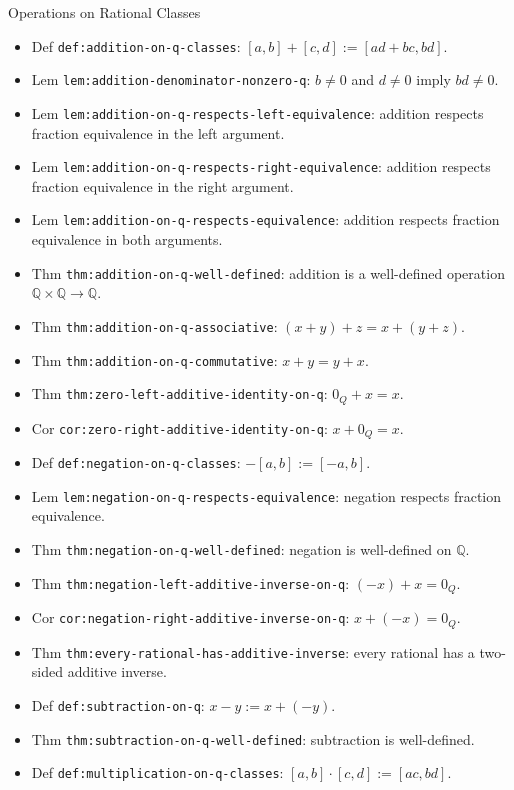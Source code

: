 \begin{topicbox}{Operations on Rational Classes}
\begin{itemize}
  \item Def \texttt{def:addition-on-q-classes}: $[a,b]+[c,d]:=[ad+bc,bd]$.
  \item Lem \texttt{lem:addition-denominator-nonzero-q}: $b\ne0$ and $d\ne0$ imply $bd\ne0$.
  \item Lem \texttt{lem:addition-on-q-respects-left-equivalence}: addition respects fraction equivalence in the left argument.
  \item Lem \texttt{lem:addition-on-q-respects-right-equivalence}: addition respects fraction equivalence in the right argument.
  \item Lem \texttt{lem:addition-on-q-respects-equivalence}: addition respects fraction equivalence in both arguments.
  \item Thm \texttt{thm:addition-on-q-well-defined}: addition is a well-defined operation $\mathbb{Q}\times\mathbb{Q}\to\mathbb{Q}$.
  \item Thm \texttt{thm:addition-on-q-associative}: $(x+y)+z=x+(y+z)$.
  \item Thm \texttt{thm:addition-on-q-commutative}: $x+y=y+x$.
  \item Thm \texttt{thm:zero-left-additive-identity-on-q}: $0_Q+x=x$.
  \item Cor \texttt{cor:zero-right-additive-identity-on-q}: $x+0_Q=x$.
  \item Def \texttt{def:negation-on-q-classes}: $-[a,b]:=[-a,b]$.
  \item Lem \texttt{lem:negation-on-q-respects-equivalence}: negation respects fraction equivalence.
  \item Thm \texttt{thm:negation-on-q-well-defined}: negation is well-defined on $\mathbb{Q}$.
  \item Thm \texttt{thm:negation-left-additive-inverse-on-q}: $(-x)+x=0_Q$.
  \item Cor \texttt{cor:negation-right-additive-inverse-on-q}: $x+(-x)=0_Q$.
  \item Thm \texttt{thm:every-rational-has-additive-inverse}: every rational has a two-sided additive inverse.
  \item Def \texttt{def:subtraction-on-q}: $x-y:=x+(-y)$.
  \item Thm \texttt{thm:subtraction-on-q-well-defined}: subtraction is well-defined.
  \item Def \texttt{def:multiplication-on-q-classes}: $[a,b]\cdot[c,d]:=[ac,bd]$.

\end{itemize}
\end{topicbox}
